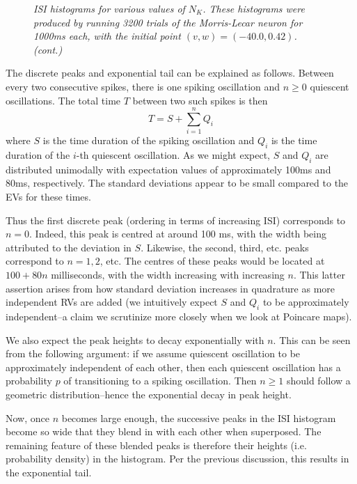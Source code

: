 \documentclass[letterpaper,12pt]{article}
\numberwithin{table}{section}
\numberwithin{figure}{section}
\numberwithin{equation}{section}
\newcommand{\ccaption}[1]{\caption{\textit{#1}}}
\begin{document}
\begin{flushleft}
\begin{figure}[!h]
        \ccaption{ISI histograms for various values of $N_K$. These histograms were produced by running 3200 trials of the Morris-Lecar neuron for 1000ms each, with the initial point $(v, w) = (-40.0, 0.42)$. (cont.)}
        \label{fig:isih}

    \end{figure}

    The discrete peaks and exponential tail can be explained as follows. Between every two consecutive spikes, there is one spiking oscillation and $n \geq 0$ quiescent oscillations. The total time $T$ between two such spikes is then
    \begin{equation}
        T = S + \sum_{i=1}^n Q_i
    \end{equation}
    where $S$ is the time duration of the spiking oscillation and $Q_i$ is the time duration of the $i$-th quiescent oscillation. As we might expect, $S$ and $Q_i$ are distributed unimodally with expectation values of approximately 100ms and 80ms, respectively. The standard deviations appear to be small compared to the EVs for these times.

    Thus the first discrete peak (ordering in terms of increasing ISI) corresponds to $n = 0$. Indeed, this peak is centred at around 100 ms, with the width being attributed to the deviation in $S$. Likewise, the second, third, etc. peaks correspond to $n = 1, 2$, etc. The centres of these peaks would be located at $100 + 80n$ milliseconds, with the width increasing with increasing $n$. This latter assertion arises from how standard deviation increases in quadrature as more independent RVs are added (we intuitively expect $S$ and $Q_i$ to be approximately independent--a claim we scrutinize more closely when we look at Poincare maps).

    We also expect the peak heights to decay exponentially with $n$. This can be seen from the following argument: if we assume quiescent oscillation to be approximately independent of each other, then each quiescent oscillation has a probability $p$ of transitioning to a spiking oscillation. Then $n \geq 1$ should follow a geometric distribution--hence the exponential decay in peak height.

    Now, once $n$ becomes large enough, the successive peaks in the ISI histogram become so wide that they blend in with each other when superposed. The remaining feature of these blended peaks is therefore their heights (i.e. probability density) in the histogram. Per the previous discussion, this results in the exponential tail.


\end{flushleft}
\end{document}
